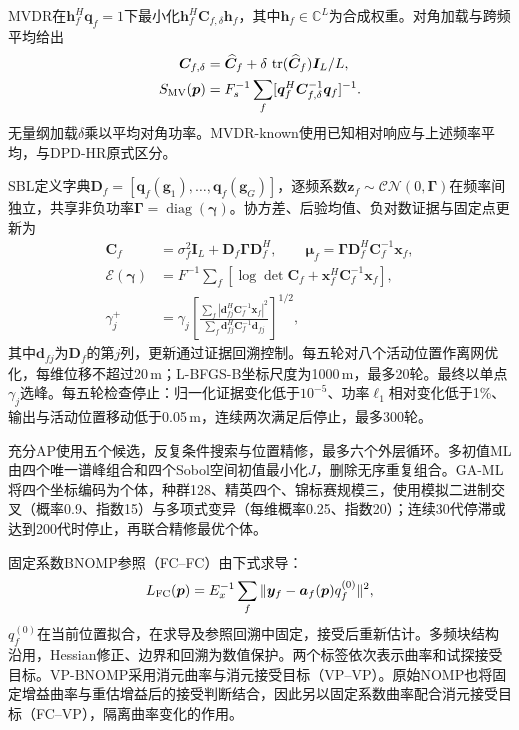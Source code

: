 \documentclass[a4paper,fleqn]{cas-sc}
\newcommand{\C}{\mathbb C}
\newcommand{\tr}{\operatorname{tr}}
\begin{document}
MVDR在$\bm h_f^H\bm q_f=1$下最小化$\bm h_f^H\bm C_{f,\delta}\bm h_f$，其中$\bm h_f\in\C^L$为合成权重\cite{Capon1969}。对角加载与跨频平均给出
\begin{equation}
\begin{split}
\bm C_{f,\delta}&=\widehat{\bm C}_f+
\delta\,\tr(\widehat{\bm C}_f)\bm I_L/L,\\
S_{\rm MV}(\bm p)&=F_s^{-1}\sum_f
[\bm q_f^H\bm C_{f,\delta}^{-1}\bm q_f]^{-1}.
\end{split}
\end{equation}
无量纲加载$\delta$乘以平均对角功率。MVDR-known使用已知相对响应与上述频率平均，与DPD-HR原式区分\cite{TirerWeiss2016}。

SBL定义字典$\bm D_f=[\bm q_f(\bm g_1),\ldots,\bm q_f(\bm g_G)]$，逐频系数$\bm z_f\sim\mathcal{CN}(0,\bm\Gamma)$在频率间独立，共享非负功率$\bm\Gamma=\operatorname{diag}(\bm\gamma)$\cite{Nannuru2019}。协方差、后验均值、负对数证据与固定点更新为
\begin{align}
\bm C_f&=\sigma_f^2\bm I_L+\bm D_f\bm\Gamma\bm D_f^H,\qquad
\bm\mu_f=\bm\Gamma\bm D_f^H\bm C_f^{-1}\bm x_f,\\
\mathcal E(\bm\gamma)&=F^{-1}\sum_f
[\log\det\bm C_f+\bm x_f^H\bm C_f^{-1}\bm x_f],\\
\gamma_j^+&=\gamma_j\left[
\frac{\sum_f|\bm d_{fj}^H\bm C_f^{-1}\bm x_f|^2}
{\sum_f\bm d_{fj}^H\bm C_f^{-1}\bm d_{fj}}
\right]^{1/2},
\end{align}
其中$\bm d_{fj}$为$\bm D_f$的第$j$列，更新通过证据回溯控制。每五轮对八个活动位置作离网优化，每维位移不超过20\,m；L-BFGS-B坐标尺度为1000\,m，最多20轮。最终以单点$\gamma_j$选峰。每五轮检查停止：归一化证据变化低于$10^{-5}$、功率$\ell_1$相对变化低于1\%、输出与活动位置移动低于0.05\,m，连续两次满足后停止，最多300轮。

充分AP使用五个候选，反复条件搜索与位置精修，最多六个外层循环。多初值ML由四个唯一谱峰组合和四个Sobol空间初值最小化$J$，删除无序重复组合。GA-ML将四个坐标编码为个体，种群128、精英四个、锦标赛规模三，使用模拟二进制交叉（概率0.9、指数15）与多项式变异（每维概率0.25、指数20）\cite{DebAgrawal1995}；连续30代停滞或达到200代时停止，再联合精修最优个体。

固定系数BNOMP参照（FC--FC）由下式求导：
\begin{equation}
L_{\rm FC}(\bm p)=E_x^{-1}\sum_f
\|\bm y_f-\bm a_f(\bm p)q_f^{(0)}\|^2,
\label{en:fixedcoef}
\end{equation}
$q_f^{(0)}$在当前位置拟合，在求导及参照回溯中固定，接受后重新估计。多频块结构沿用\cite{Yang2022}，Hessian修正、边界和回溯为数值保护。两个标签依次表示曲率和试探接受目标。VP-BNOMP采用消元曲率与消元接受目标（VP--VP）。原始NOMP也将固定增益曲率与重估增益后的接受判断结合\cite{Mamandipoor2016}，因此另以固定系数曲率配合消元接受目标（FC--VP），隔离曲率变化的作用。
\end{document}
